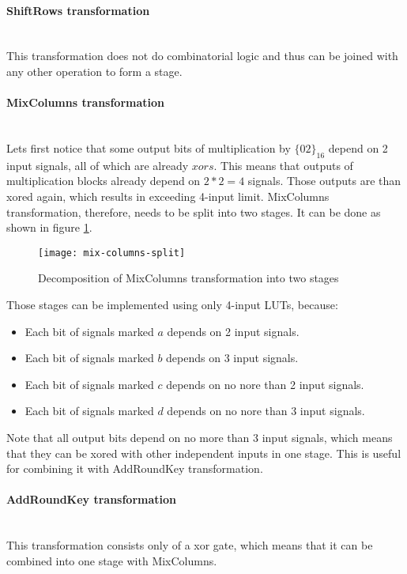 \paragraph{ShiftRows transformation}\mbox{}\\
This transformation does not do combinatorial logic and thus can be joined with any other operation to form a stage.


\paragraph{MixColumns transformation}\mbox{}\\
Lets first notice that some output bits of multiplication by $\{02\}_{16}$ depend on 2 input signals, all of which are already $xors$. This means that outputs of multiplication blocks already depend on $2 * 2 = 4$ signals. Those outputs are than xored again, which results in exceeding 4-input limit. MixColumns transformation, therefore, needs to be split into two stages. It can be done as shown in figure \ref{fig:mix-columns-split}.

\begin{figure}[!h]
\centering
\texttt{[image: mix-columns-split]}
\caption{Decomposition of MixColumns transformation into two stages}
\label{fig:mix-columns-split}
\end{figure}

Those stages can be implemented using only 4-input LUTs, because:
\begin{itemize}[nolistsep]
\item Each bit of signals marked $a$ depends on 2 input signals.
\item Each bit of signals marked $b$ depends on 3 input signals.
\item Each bit of signals marked $c$ depends on no nore than 2 input signals.
\item Each bit of signals marked $d$ depends on no nore than 3 input signals.
\end{itemize}

Note that all output bits depend on no more than 3 input signals, which means that they can be xored with other independent inputs in one stage. This is useful for combining it with AddRoundKey transformation.


\paragraph{AddRoundKey transformation}\mbox{}\\
This transformation consists only of a xor gate, which means that it can be combined into one stage with MixColumns.


